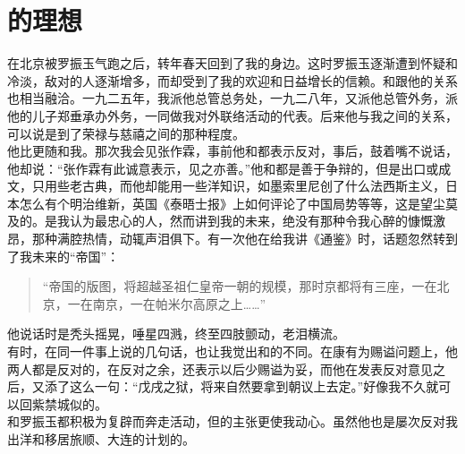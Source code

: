 \fancyhead[RO]{} %
\fancyhead[LE]{} %
\chapter*{的理想}
\thispagestyle{empty}
在北京被罗振玉气跑之后，转年春天回到了我的身边。这时罗振玉逐渐遭到怀疑和冷淡，敌对的人逐渐增多，而却受到了我的欢迎和日益增长的信赖。和跟他的关系也相当融洽。一九二五年，我派他总管总务处，一九二八年，又派他总管外务，派他的儿子郑垂承办外务，一同做我对外联络活动的代表。后来他与我之间的关系，可以说是到了荣禄与慈禧之间的那种程度。\\

他比更随和我。那次我会见张作霖，事前他和都表示反对，事后，鼓着嘴不说话，他却说：“张作霖有此诚意表示，见之亦善。”他和都是善于争辩的，但是出口或成文，只用些老古典，而他却能用一些洋知识，如墨索里尼创了什么法西斯主义，日本怎么有个明治维新，英国《泰晤士报》上如何评论了中国局势等等，这是望尘莫及的。是我认为最忠心的人，然而讲到我的未来，绝没有那种令我心醉的慷慨激昂，那种满腔热情，动辄声泪俱下。有一次他在给我讲《通鉴》时，话题忽然转到了我未来的“帝国”：\\

\begin{quote}
	“帝国的版图，将超越圣祖仁皇帝一朝的规模，那时京都将有三座，一在北京，一在南京，一在帕米尔高原之上……”\\
\end{quote}

他说话时是秃头摇晃，唾星四溅，终至四肢颤动，老泪横流。\\

有时，在同一件事上说的几句话，也让我觉出和的不同。在康有为赐谥问题上，他两人都是反对的，在反对之余，还表示以后少赐谥为妥，而他在发表反对意见之后，又添了这么一句：“戊戌之狱，将来自然要拿到朝议上去定。”好像我不久就可以回紫禁城似的。\\

和罗振玉都积极为复辟而奔走活动，但的主张更使我动心。虽然他也是屡次反对我出洋和移居旅顺、大连的计划的。\\

